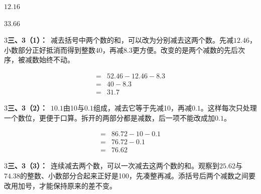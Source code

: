 \documentclass[multi=snippet,border={5bp 20bp 5bp 5bp}]{standalone}
\newenvironment{snippet}[3]{\begin{minipage}{#1bp}\color{answerred}\fontsize{#2}{#3}\selectfont\raggedright}{\end{minipage}}
\begin{document}
\begin{snippet}{37.0}{10.5}{14}\SourceSans\setlength{\mathindent}{2bp}\(12.16\)\end{snippet}
\begin{snippet}{37.0}{10.5}{14}\SourceSans\setlength{\mathindent}{2bp}\(33.66\)\end{snippet}
\begin{snippet}{505}{11.5}{14}\begin{multicols}{3}\raggedcolumns \textbf{三、3（1）：}\ 减去括号中两个数的和，可以改为分别减去这两个数。先减\(12.46\)\allowbreak ，小数部分正好抵消而得到整数40，再减\(8.3\)\allowbreak 更方便。改变的是两个减数的先后次序，被减数始终不动。\end{multicols}\end{snippet}
\begin{snippet}{195.00000000000003}{10.5}{12.8}\SourceSans\setlength{\mathindent}{2bp}\[\begin{aligned}={}&52.46-12.46-8.3\\={}&40-8.3\\={}&31.7\end{aligned}\]\end{snippet}
\begin{snippet}{505}{11.5}{14}\begin{multicols}{3}\raggedcolumns \textbf{三、3（2）：}\ \(10.1\)\allowbreak 由10与\(0.1\)\allowbreak 组成，减去它等于先减10，再减\(0.1\)\allowbreak 。这样每次只处理一个数位，更便于口算。拆开的两部分都是减数，后一项不能改成加\(0.1\)\allowbreak 。\end{multicols}\end{snippet}
\begin{snippet}{217.0}{10.5}{12.8}\SourceSans\setlength{\mathindent}{2bp}\[\begin{aligned}={}&86.72-10-0.1\\={}&76.72-0.1\\={}&76.62\end{aligned}\]\end{snippet}
\begin{snippet}{505}{11.5}{14}\begin{multicols}{3}\raggedcolumns \textbf{三、3（3）：}\ 连续减去两个数，可以一次减去这两个数的和。观察到\(25.62\)\allowbreak 与\(74.38\)\allowbreak 的整数、小数部分合起来正好是100，先凑整再减。添括号后两个减数之间要改用加号，才能保持原来的差不变。\end{multicols}\end{snippet}
\end{document}
